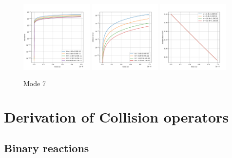 \documentclass{article}
\begin{document}
\begin{figure}[!htbp]
	\centering
	\includegraphics[width=0.32\textwidth]{fig/dat_1ev_cs_m7_tail.png}
	\includegraphics[width=0.32\textwidth]{fig/dat_1ev_cs_m7_temp_error.png}
	\includegraphics[width=0.32\textwidth]{fig/dat_1ev_cs_m7_temp.png}
	\caption{Mode 7}
\end{figure}




\newpage
\appendix

\section{Derivation of Collision operators}

\subsection{Binary reactions}
\end{document}
